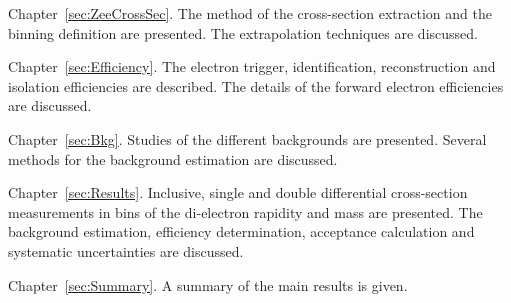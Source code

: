 \begin{description}
\item Chapter~\ref{sec:ZeeCrossSec}. The method of the cross-section extraction and the binning definition are presented. The extrapolation techniques are discussed.

\item Chapter~\ref{sec:Efficiency}. The electron trigger, identification, reconstruction and isolation efficiencies are described. The details of the forward electron efficiencies are discussed.

\item Chapter~\ref{sec:Bkg}. Studies of the different backgrounds are presented. Several methods for the background estimation are discussed.

\item Chapter~\ref{sec:Results}. Inclusive, single and double differential cross-section measurements in bins of the di-electron rapidity and mass are presented. The background estimation, efficiency determination, acceptance calculation and systematic uncertainties are discussed.

\item Chapter~\ref{sec:Summary}. A summary of the main results is given.
\end{description}
